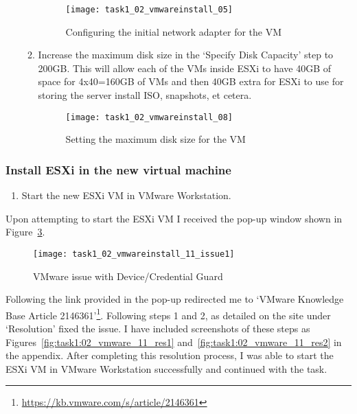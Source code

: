 \begin{enumerate}[resume*=task1methodology]
\begin{enumerate}[label=(\alph*)]
        \begin{figure}[H]
          \centering
          \captionsetup{skip=2pt}
          \texttt{[image: task1\_02\_vmwareinstall\_05]}
          \caption{Configuring the initial network adapter for the VM}
          \label{fig:task1:02_vmwarewiz_05}
        \end{figure}
      \item Increase the maximum disk size in the `Specify Disk Capacity' step to 200GB. This will allow each of the VMs inside ESXi to have 40GB of space for 4x40=160GB of VMs and then 40GB extra for ESXi to use for storing the server install ISO, snapshots, et cetera.
        \begin{figure}[H]
          \centering
          \captionsetup{skip=2pt}
          \texttt{[image: task1\_02\_vmwareinstall\_08]}
          \caption{Setting the maximum disk size for the VM}
          \label{fig:task1:02_vmwarewiz_08}
        \end{figure}
    \end{enumerate}
\end{enumerate}

\subsubsection*{Install ESXi in the new virtual machine}
\begin{enumerate}[resume*=task1methodology]
  \item Start the new ESXi VM in VMware Workstation.
\end{enumerate}

\noindent Upon attempting to start the ESXi VM I received the pop-up window shown in Figure~\ref{fig:task1:02_vmwarewiz_11_issue}.

\begin{figure}[H]
  \centering
  \captionsetup{skip=2pt}
  \texttt{[image: task1\_02\_vmwareinstall\_11\_issue1]}
  \caption{VMware issue with Device/Credential Guard}
  \label{fig:task1:02_vmwarewiz_11_issue}
\end{figure}

\noindent Following the link provided in the pop-up redirected me to `VMware Knowledge Base Article 2146361'\footnote{\url{https://kb.vmware.com/s/article/2146361}}. Following steps 1 and 2, as detailed on the site under `Resolution' fixed the issue. I have included screenshots of these steps as Figures~\ref{fig:task1:02_vmware_11_res1} and~\ref{fig:task1:02_vmware_11_res2} in the  appendix. After completing this resolution process, I was able to start the ESXi VM in VMware Workstation successfully and continued with the task.

